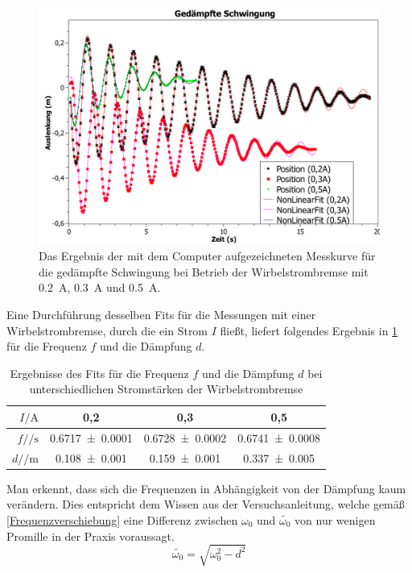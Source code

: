 \documentclass[
	a4paper,
	12pt,
	pagesize,
	ngerman
]{scrartcl}
\begin{document}
	\begin{figure}[htb]
		\includegraphics[width=1\textwidth]{Gedaempfte_Schwingung_Graph}
		\centering
		\caption{Das Ergebnis der mit dem Computer aufgezeichneten Messkurve für die gedämpfte Schwingung bei Betrieb der Wirbelstrombremse mit \SI{0,2}{\ampere}, \SI{0,3}{\ampere} und \SI{0,5}{\ampere}.}
		\label{gedämpfte_Schwingung}
		\centering
	\end{figure}
	Eine Durchführung desselben Fits für die Messungen mit einer Wirbelstrombremse, durch die ein Strom $ I $ fließt, liefert folgendes Ergebnis in \cref{gedaempftTab} für die Frequenz $ f $ und die Dämpfung $ d $.\\
	\begin{table}[htb]
		\centering
		\begin{tabular}{ r | c | c | c |}
			$I /\si{\ampere}$& 0,2 & 0,3 & 0,5\\ \hline
			$f  /\si{\per \second}$ & \num{0,6717 \pm 0,0001} & \num{0,6728 \pm 0,0002} & \num{0,6741 \pm 0,0008}\\
			$d /\si{\per \meter}  $ & \num{0,108 \pm 0,001} & \num{0,159 \pm 0,001} & \num{0,337 \pm 0,005}
		\end{tabular}
		\caption{Ergebnisse des Fits für die Frequenz $ f $ und die Dämpfung $ d $ bei unterschiedlichen Stromstärken der Wirbelstrombremse}
		\label{gedaempftTab}
	\end{table}
	Man erkennt, dass sich die Frequenzen in Abhängigkeit von der Dämpfung kaum verändern. Dies entspricht dem Wissen aus der Versuchsanleitung, welche gemäß \cref{Frequenzverschiebung} eine Differenz zwischen $ \omega_0 $ und $ \tilde{\omega_0} $ von nur wenigen Promille in der Praxis voraussagt.
	\begin{equation}
		\tilde{\omega_0} = \sqrt{\omega_0^2 - d^2}
		\label{Frequenzverschiebung}
	\end{equation}
\end{document}
